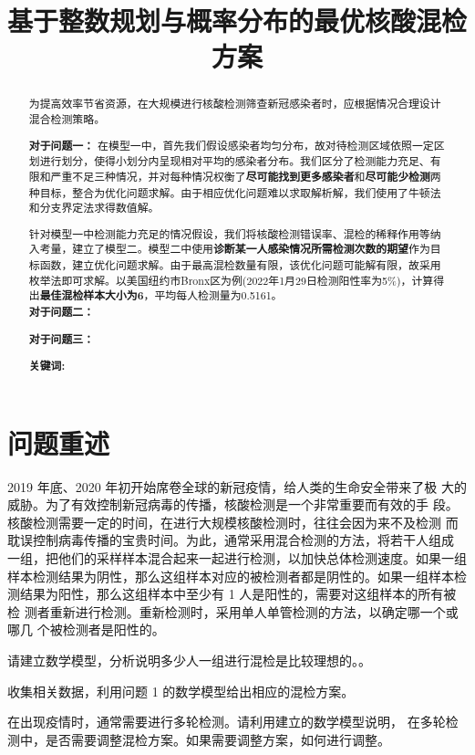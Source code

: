 \documentclass[withoutpreface,bwprint]{cumcmthesis} %
\title{基于整数规划与概率分布的最优核酸混检方案}%
\begin{document}
\maketitle
\begin{abstract}%


为提高效率节省资源，在大规模进行核酸检测筛查新冠感染者时，应根据情况合理设计混合检测策略。

\textbf{对于问题一：}
在模型一中，首先我们假设感染者均匀分布，故对待检测区域依照一定区划进行划分，使得小划分内呈现相对平均的感染者分布。我们区分了检测能力充足、有限和严重不足三种情况，并对每种情况权衡了\textbf{尽可能找到更多感染者}和\textbf{尽可能少检测}两种目标，整合为优化问题求解。由于相应优化问题难以求取解析解，我们使用了牛顿法和分支界定法求得数值解。

针对模型一中检测能力充足的情况假设，我们将核酸检测错误率、混检的稀释作用等纳入考量，建立了模型二。模型二中使用\textbf{诊断某一人感染情况所需检测次数的期望}作为目标函数，建立优化问题求解。由于最高混检数量有限\cite{bib1}，该优化问题可能解有限，故采用枚举法即可求解。以美国纽约市Bronx区为例(2022年1月29日检测阳性率为5\%)，计算得出\textbf{最佳混检样本大小为6}，平均每人检测量为0.5161。\\
\textbf{对于问题二：}

\textbf{对于问题三：}

\textbf{关键词:}
\end{abstract}



\section{问题重述}
2019 年底、2020 年初开始席卷全球的新冠疫情，给人类的生命安全带来了极
大的威胁。为了有效控制新冠病毒的传播，核酸检测是一个非常重要而有效的手
段。核酸检测需要一定的时间，在进行大规模核酸检测时，往往会因为来不及检测
而耽误控制病毒传播的宝贵时间。为此，通常采用混合检测的方法，将若干人组成
一组，把他们的采样样本混合起来一起进行检测，以加快总体检测速度。如果一组
样本检测结果为阴性，那么这组样本对应的被检测者都是阴性的。如果一组样本检
测结果为阳性，那么这组样本中至少有 1 人是阳性的，需要对这组样本的所有被检
测者重新进行检测。重新检测时，采用单人单管检测的方法，以确定哪一个或哪几
个被检测者是阳性的。

 \begin{problem}
请建立数学模型，分析说明多少人一组进行混检是比较理想的。。
 \end{problem}
 \begin{problem}
收集相关数据，利用问题 1 的数学模型给出相应的混检方案。
 \end{problem}
 \begin{problem}
在出现疫情时，通常需要进行多轮检测。请利用建立的数学模型说明，
在多轮检测中，是否需要调整混检方案。如果需要调整方案，如何进行调整。
\end{problem}
\end{document}
